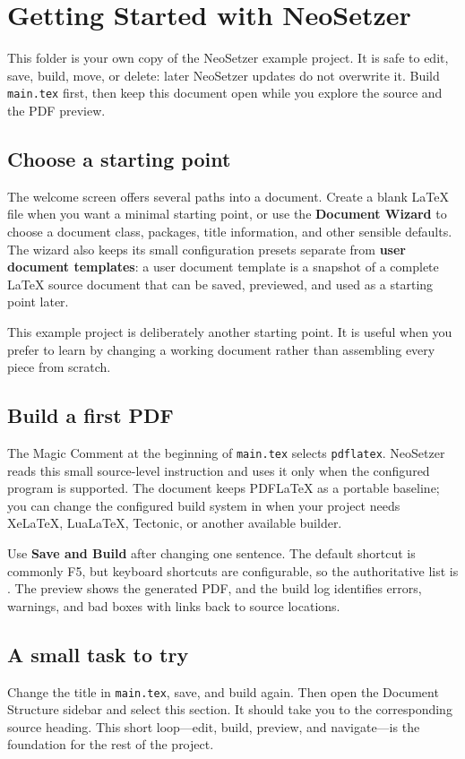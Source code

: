 
\section{Getting Started with NeoSetzer}
\label{sec:getting-started}

This folder is your own copy of the NeoSetzer example project. It is safe to
edit, save, build, move, or delete: later NeoSetzer updates do not overwrite
it. Build \texttt{main.tex} first, then keep this document open while you
explore the source and the PDF preview.

\subsection{Choose a starting point}
\label{sec:getting-started:starting-point}

The welcome screen offers several paths into a document. Create a blank LaTeX
file when you want a minimal starting point, or use the \textbf{Document
Wizard} to choose a document class, packages, title information, and other
sensible defaults. The wizard also keeps its small configuration presets
separate from \textbf{user document templates}: a user document template is a
snapshot of a complete LaTeX source document that can be saved, previewed, and
used as a starting point later.

This example project is deliberately another starting point. It is useful when
you prefer to learn by changing a working document rather than assembling every
piece from scratch.

\subsection{Build a first PDF}
\label{sec:getting-started:first-build}

The Magic Comment at the beginning of \texttt{main.tex} selects
\texttt{pdflatex}. NeoSetzer reads this small source-level instruction and
uses it only when the configured program is supported. The document keeps
PDFLaTeX as a portable baseline; you can change the configured build system in
 when your project needs XeLaTeX, LuaLaTeX, Tectonic, or
another available builder.

Use \textbf{Save and Build} after changing one sentence. The default shortcut
is commonly F5, but keyboard shortcuts are configurable, so the authoritative
list is . The preview
shows the generated PDF, and the build log identifies errors, warnings, and bad
boxes with links back to source locations.

\subsection{A small task to try}
\label{sec:getting-started:task}

Change the title in \texttt{main.tex}, save, and build again. Then open the
Document Structure sidebar and select this section. It should take you to the
corresponding source heading. This short loop---edit, build, preview, and
navigate---is the foundation for the rest of the project.

